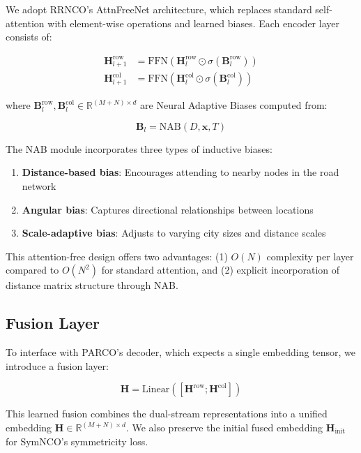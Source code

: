 \documentclass[lettersize,journal]{IEEEtran}
\begin{document}
We adopt RRNCO's AttnFreeNet architecture, which replaces standard self-attention with element-wise operations and learned biases. Each encoder layer consists of:

\begin{align}
\mathbf{H}^{\text{row}}_{l+1} &= \text{FFN}(\mathbf{H}^{\text{row}}_l \odot \sigma(\mathbf{B}^{\text{row}}_l)) \\
\mathbf{H}^{\text{col}}_{l+1} &= \text{FFN}(\mathbf{H}^{\text{col}}_l \odot \sigma(\mathbf{B}^{\text{col}}_l))
\end{align}

where $\mathbf{B}^{\text{row}}_l, \mathbf{B}^{\text{col}}_l \in \mathbb{R}^{(M+N) \times d}$ are Neural Adaptive Biases computed from:

\begin{equation}
\mathbf{B}_l = \text{NAB}(D, \mathbf{x}, T)
\end{equation}

The NAB module incorporates three types of inductive biases:
\begin{enumerate}
\item \textbf{Distance-based bias}: Encourages attending to nearby nodes in the road network
\item \textbf{Angular bias}: Captures directional relationships between locations
\item \textbf{Scale-adaptive bias}: Adjusts to varying city sizes and distance scales
\end{enumerate}

This attention-free design offers two advantages: (1) $O(N)$ complexity per layer compared to $O(N^2)$ for standard attention, and (2) explicit incorporation of distance matrix structure through NAB.

\subsection{Fusion Layer}

To interface with PARCO's decoder, which expects a single embedding tensor, we introduce a fusion layer:

\begin{equation}
\mathbf{H} = \text{Linear}([\mathbf{H}^{\text{row}}; \mathbf{H}^{\text{col}}])
\end{equation}

This learned fusion combines the dual-stream representations into a unified embedding $\mathbf{H} \in \mathbb{R}^{(M+N) \times d}$. We also preserve the initial fused embedding $\mathbf{H}_{\text{init}}$ for SymNCO's symmetricity loss.
\end{document}
